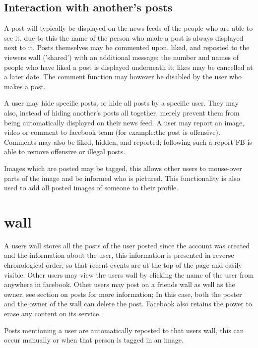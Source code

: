 \subsection{Interaction with another's posts}
A post will typically be displayed on the news feeds of the people who are able
to see it, due to this the name of the person who made a post is always
displayed next to it. Posts themselves may be commented upon, liked, and
reposted to the viewers wall ('shared') with an additional message; the number
and names of people who have liked a post is displayed underneath it; likes may
be cancelled at a later date. The comment function may however be disabled by
the user who makes a post.

A user may hide specific posts, or hide all posts by a specific user. They may
also, instead of hiding another's posts all together, merely prevent them from
being automatically displayed on their news feed.  A user may report an image, video or comment to
facebook team (for example:the post is offensive). Comments may also be liked,
hidden, and reported; following such a report FB is able to remove offensive or
illegal posts. 

Images which are posted may be tagged, this allows other users to mouse-over
parts of the image and be informed who is pictured. This functionality is also
used to add all posted images of someone to their profile.

\section{wall}
A users wall stores all the posts of the user posted since the account was
created and the information about the user, this information is presented in
reverse chronological order, so that recent events are at the top of the page
and easily visible. Other users may view the users wall by clicking the name of
the user from anywhere in facebook. Other users may post on a friends wall as
well as the owner, see section on posts for more information; In this case, both
the poster and the owner of the wall can delete the post. Facebook also retains
the power to erase any content on its service.

Posts mentioning a user are automatically reposted to that users wall, this can
occur manually or when that person is tagged in an image.

